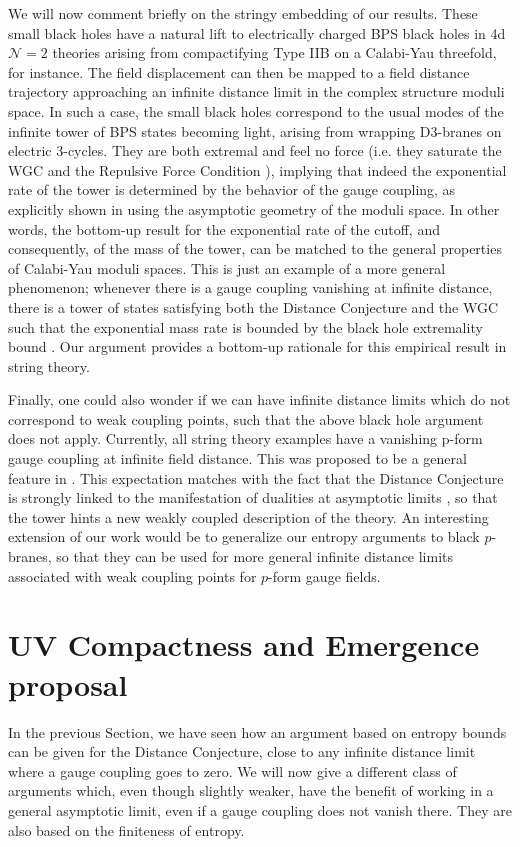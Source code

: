 \documentclass[11pt]{article}
\numberwithin{equation}{section}
\numberwithin{equation}{section}
\theoremstyle{remark}
\begin{document}
We will now comment briefly on the stringy embedding of our results. These small black holes have a natural lift to electrically charged BPS black holes in 4d $\mathcal{N}=2$ theories arising from compactifying Type IIB on a Calabi-Yau threefold, for instance. The field displacement can then be mapped to a field distance trajectory approaching an infinite distance limit in the complex structure moduli space. In such a case, the small black holes  correspond to the usual modes of the infinite tower of BPS states becoming light, arising from wrapping D3-branes on electric 3-cycles. They are both extremal and feel no force (i.e. they saturate the WGC and the Repulsive Force Condition \cite{Palti:2017elp,Heidenreich:2019zkl}), implying that indeed the exponential rate of the tower is determined by the behavior of the gauge coupling, as explicitly shown in \cite{Lee:2018spm,Gendler:2020dfp} using the asymptotic geometry of the moduli space. In other words, the bottom-up result for the exponential rate of the cutoff, and consequently, of the mass of the tower, can be matched to the general properties of Calabi-Yau moduli spaces. 
This is just an example of a more general phenomenon; whenever there is a gauge coupling vanishing at infinite distance, there is a tower of states satisfying both the Distance Conjecture and the WGC such that the exponential mass rate is bounded by the black hole extremality bound \cite{Lee:2018spm,Gendler:2020dfp}. Our argument provides a bottom-up rationale for this empirical result in string theory. 





Finally, one could also wonder if we can have infinite distance limits which do not correspond to weak coupling points, such that the above black hole argument does not apply. Currently, all string theory examples have a vanishing p-form gauge coupling at infinite field distance. This was proposed to be a general feature in \cite{Gendler:2020dfp}. This expectation matches with the fact that the Distance Conjecture is strongly linked to the manifestation of dualities at asymptotic limits \cite{Ooguri:2006in}, so that the tower hints a new weakly coupled description of the theory. An interesting extension of our work would be to generalize our entropy arguments to black $p$-branes, so that they can be used for more general infinite distance limits associated with weak coupling points for $p$-form gauge fields.




\section{UV Compactness and Emergence proposal} \label{sec:emergence}
In the previous Section, we have seen how an argument based on entropy bounds can be given for the Distance Conjecture, close to any infinite distance limit where a gauge coupling goes to zero. We will now give a different class of arguments which, even though slightly weaker, have the benefit of working in a general asymptotic limit, even if a gauge coupling does not vanish there. They are also based on the finiteness of entropy.
\end{document}
